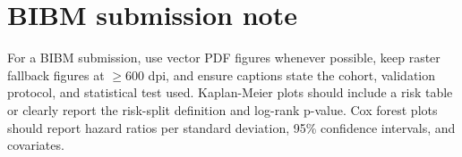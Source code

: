 \documentclass[11pt]{article}
\begin{document}
\section{BIBM submission note}
For a BIBM submission, use vector PDF figures whenever possible, keep raster fallback figures at $\geq 600$ dpi, and ensure captions state the cohort, validation protocol, and statistical test used. Kaplan-Meier plots should include a risk table or clearly report the risk-split definition and log-rank p-value. Cox forest plots should report hazard ratios per standard deviation, 95\% confidence intervals, and covariates.
\end{document}
